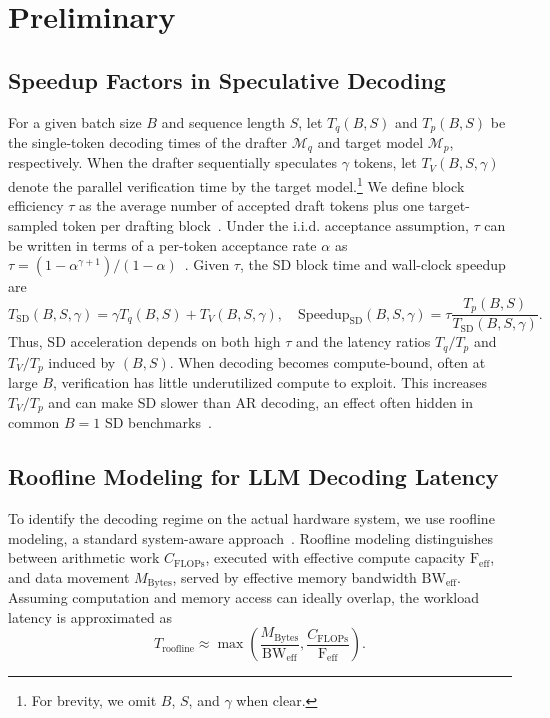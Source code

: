 \documentclass{llmxive}
\providecommand{\DrafterDist}{q}
\providecommand{\TargetDist}{p}
\providecommand{\Drafter}{\mathcal{M}_{\DrafterDist}}
\providecommand{\Target}{\mathcal{M}_{\TargetDist}}
\providecommand{\DraftLength}{\gamma}
\providecommand{\TargetTime}{T_\TargetDist}
\providecommand{\TargetTimebs}{T_\TargetDist(B,S)}
\providecommand{\DraftTime}{T_\DrafterDist}
\providecommand{\DraftTimebs}{T_\DrafterDist(B,S)}
\providecommand{\VerifyTime}{T_V}
\providecommand{\VerifyTimebsg}{T_V(B,S,\DraftLength)}
\providecommand{\SDBlockTime}{T_{\mathrm{SD}}}
\providecommand{\SDSpeedup}{\mathrm{Speedup}_{\mathrm{SD}}}
\providecommand{\mal}{\tau}
\providecommand{\CompFLOPs}{C_{\mathrm{FLOPs}}}
\providecommand{\MemBytes}{M_{\mathrm{Bytes}}}
\providecommand{\EffBandwidth}{\mathrm{BW}_{\mathrm{eff}}}
\providecommand{\RooflineTime}{T_{\mathrm{roofline}}}
\begin{document}
\section{Preliminary}
\label{sec:preliminary}

\subsection{Speedup Factors in Speculative Decoding}
\label{subsec:sd}

For a given batch size $B$ and sequence length $S$, let $\DraftTimebs$ and $\TargetTimebs$ be the single-token decoding times of the drafter $\Drafter$ and target model $\Target$, respectively.
When the drafter sequentially speculates $\DraftLength$ tokens, let $\VerifyTimebsg$ denote the parallel verification time by the target model.\footnote{For brevity, we omit $B$, $S$, and $\gamma$ when clear.}
We define block efficiency $\mal$ as the average number of accepted draft tokens plus one target-sampled token per drafting block~\citep{zhou2024distillspec}.
Under the i.i.d. acceptance assumption, $\mal$ can be written in terms of a per-token acceptance rate $\alpha$ as
$\mal=(1-\alpha^{\DraftLength+1})/(1-\alpha)$~\citep{leviathan2023fast,sadhukhan2024magicdec}.
Given $\mal$, the SD block time and wall-clock speedup are
\begin{equation}
\SDBlockTime(B,S,\gamma)
=
\gamma \DraftTimebs + \VerifyTimebsg,
\quad
\SDSpeedup(B,S,\gamma)
=
\mal \frac{\TargetTimebs}
{\SDBlockTime(B,S,\gamma)}.
\label{eq:sd_speedup}
\end{equation}
Thus, SD acceleration depends on both high $\mal$ and the latency ratios
$\DraftTime/\TargetTime$ and $\VerifyTime/\TargetTime$ induced by $(B,S)$.
When decoding becomes compute-bound, often at large $B$, verification has little underutilized compute to exploit.
This increases $\VerifyTime/\TargetTime$ and can make SD slower than AR decoding, an effect often hidden in common $B=1$ SD benchmarks~\citep{sadhukhan2024magicdec,xia2024unlocking}.


\subsection{Roofline Modeling for LLM Decoding Latency}
\label{subsec:roofline-latency}
To identify the decoding regime on the actual hardware system, we use roofline modeling, a standard system-aware approach~\citep{williams2009roofline,yuan2024llm}.
Roofline modeling distinguishes between arithmetic work $\CompFLOPs$, executed with effective compute capacity $\mathrm{F}_{\mathrm{eff}}$, and data movement $\MemBytes$, served by effective memory bandwidth $\EffBandwidth$.
Assuming computation and memory access can ideally overlap, the workload latency is approximated as
\begin{equation}
\RooflineTime
\approx
\max\left(
\frac{\MemBytes}{\EffBandwidth},
\frac{\CompFLOPs}{\mathrm{F}_{\mathrm{eff}}}
\right).
\label{eq:roofline_basic}
\end{equation}
\end{document}
